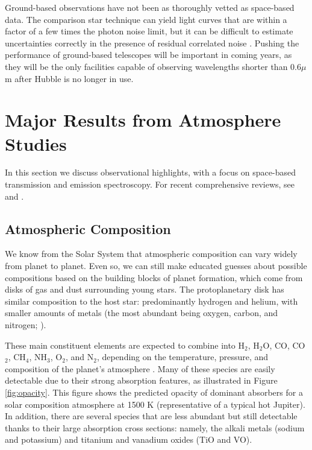 \documentclass[graybox,natbib,nosecnum]{svmult}
\begin{document}
Ground-based observations have not been as thoroughly vetted as space-based data.  The comparison star technique can yield light curves that are within a factor of a few times the photon noise limit, but it can be difficult to estimate uncertainties correctly in the presence of residual correlated noise \citep[e.g.][]{jordan13, beatty16}.  Pushing the performance of ground-based telescopes will be important in coming years, as they will be the only facilities capable of observing wavelengths shorter than $0.6\mu$m after Hubble is no longer in use. 

\section{Major Results from Atmosphere Studies}
In this section we discuss observational highlights, with a focus on space-based transmission and emission spectroscopy.  For recent comprehensive reviews, see \cite{crossfield15} and \cite{deming17}. 

\subsection{Atmospheric Composition}
We know from the Solar System that atmospheric composition can vary widely from planet to planet. Even so, we can still make educated guesses about possible compositions based on the building blocks of planet formation,  which come from disks of gas and dust surrounding young stars.  The protoplanetary disk has similar composition to the host star: predominantly hydrogen and helium, with smaller amounts of metals (the most abundant being oxygen, carbon, and nitrogen; \citealt{anders89}).  %

These main constituent elements are expected to combine into H$_2$, H$_2$O, CO, CO$_2$, CH$_4$, NH$_3$, O$_2$, and N$_2$, depending on the temperature, pressure, and composition of the planet's atmosphere \citep{moses13}.  Many of these species are easily detectable due to their strong absorption features, as illustrated in Figure\,\ref{fig:opacity}.  This figure shows the predicted opacity of dominant absorbers for a solar composition atmosphere at 1500 K (representative of a typical hot Jupiter).  In addition, there are several species that are less abundant but still detectable thanks to their large absorption cross sections: namely, the alkali metals (sodium and potassium) and titanium and vanadium oxides (TiO and VO). 
\end{document}
